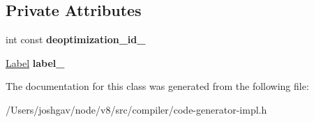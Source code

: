 \subsection*{Private Attributes}
\begin{DoxyCompactItemize}
\item 
int const {\bfseries deoptimization\+\_\+id\+\_\+}\hypertarget{classv8_1_1internal_1_1compiler_1_1_deoptimization_exit_ab223730fc3a0e0608e4a3e1a20f7f6e1}{}\label{classv8_1_1internal_1_1compiler_1_1_deoptimization_exit_ab223730fc3a0e0608e4a3e1a20f7f6e1}

\item 
\hyperlink{classv8_1_1internal_1_1_label}{Label} {\bfseries label\+\_\+}\hypertarget{classv8_1_1internal_1_1compiler_1_1_deoptimization_exit_a8b7f3ed04c11e7f2a3dafbaa08ee7037}{}\label{classv8_1_1internal_1_1compiler_1_1_deoptimization_exit_a8b7f3ed04c11e7f2a3dafbaa08ee7037}

\end{DoxyCompactItemize}


The documentation for this class was generated from the following file\+:\begin{DoxyCompactItemize}
\item 
/\+Users/joshgav/node/v8/src/compiler/code-\/generator-\/impl.\+h\end{DoxyCompactItemize}
